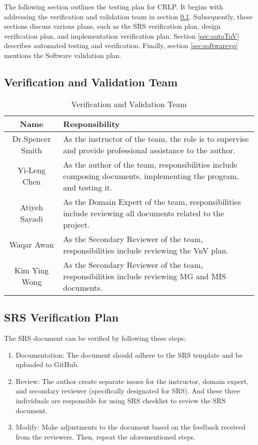 \documentclass[12pt, titlepage]{article}
\begin{document}
The following section outlines the testing plan for CRLP. It begins with addressing the verification and validation team in section \ref{sec:vnvteam}. Subsequently, these sections discuss various plans, such as the SRS verification plan, design verification plan, and implementation verification plan. Section \ref{sec:autoTnV} describes automated testing and verification. Finally, section \ref{sec:softwarevp} mentions the Software validation plan.

\subsection{Verification and Validation Team} \label{sec:vnvteam}

\begin{table}
    \centering
    \begin{tabular}{|c|p{13cm}|} 
    \hline
        Name & Responsibility  \\
    \hline
        Dr.Spencer Smith & As the instructor of the team, the role is to supervise and provide professional assistance to the author.\\
    \hline
        Yi-Leng Chen & As the author of the team, responsibilities include composing documents, implementing the program, and testing it.\\
    \hline
        Atiyeh Sayadi & As the Domain Expert of the team, responsibilities include reviewing all documents related to the project.  \\
    \hline
        Waqar Awan & As the Secondary Reviewer of the team, responsibilities include reviewing the VnV plan.\\
    \hline
        Kim Ying Wong & As the Secondary Reviewer of the team, responsibilities include reviewing MG and MIS documents. \\
    \hline
    \end{tabular}
    \caption{Verification and Validation Team}
    \label{tab:VnVTeam}
\end{table}

\subsection{SRS Verification Plan}
The SRS document can be verified by following these steps:
\begin{enumerate}
    \item Documentation: The document should adhere to the SRS template \cite{srstem} and be uploaded to GitHub.
    \item Review: The author create separate issues for the instructor, domain expert, and secondary reviewer (specifically designated for SRS). And these three individuals are responsible for using SRS checklist \cite{srscheck} to review the SRS document.
    \item Modify: Make adjustments to the document based on the feedback received from the reviewers. Then, repeat the aforementioned steps.
    
\end{enumerate}
\end{document}
